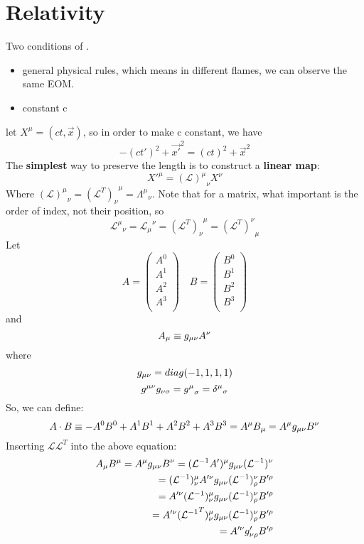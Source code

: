 \section{Relativity}
Two conditions of \SR{}. 
\begin{itemize}
    \item general physical rules, which means in different flames, we can 
	observe the same EOM.
    \item constant c
\end{itemize}
let $X^\mu=(ct, \vec{x})$, so in order to make c constant, we have
\[
    -(ct')^2+\vec{x'}^2 = (ct)^2 +\vec{x}^2
\]
The \textbf{simplest} way to preserve the length is to construct a \textbf{linear map}:
\[
    X'^\mu = {(\mathcal{L})^\mu}_{\nu}X^\nu
\]
Where ${(\mathcal{L})^\mu}_{\nu} = {(\mathcal{L}^T)_\nu}^{\mu} = {\Lambda^\mu}_\nu$.
Note that for a matrix, what important is the order of index, not their position, so
\[
    {\mathcal{L}^{\mu}}_{\nu}={\mathcal{L}_{\mu}}^{\nu}={(\mathcal{L}^T)_{\nu}}^{\mu}={(\mathcal{L}^T)^{\nu}}_{\mu}
\]
Let 
\[
    A = \begin{pmatrix}
	A^0 \\
	A^1 \\
	A^2 \\
	A^3 \\
    \end{pmatrix}\quad
    B = \begin{pmatrix}
	B^0 \\
	B^1 \\
	B^2 \\
	B^3 \\
    \end{pmatrix}
\]
and 
\[
    A_\mu  \equiv g_{\mu\nu}A^\nu
\]
where 
\begin{equation}
    g_{\mu\nu} = diag(-1, 1, 1, 1)
\end{equation}
\[
    g^{\mu\nu}g_{\nu\sigma}={g^{\mu}}_\sigma={\delta^{\mu}}_\sigma 
\]
So, we can define:
\[
    A\cdot B \equiv -A^0B^0 + A^1B^1 + A^2B^2 + A^3B^3 = A^\mu B_\mu = A^\mu g_{\mu\nu}B^\nu
\]
Inserting $\mathcal{L}\mathcal{L}^T$ into the above equation:
\[
    \begin{aligned}
	A_\mu B^\mu= A^\mu g_{\mu\nu}B^\nu = (\mathcal{L}^{-1}A')^{\mu}g_{\mu\nu}(\mathcal{L}^{-1})^\nu \\
	= (\mathcal{L}^{-1})^\mu_{\nu}A'^{\nu}g_{\mu\nu}(\mathcal{L}^{-1})^\nu_{\rho}B'^\rho    \\
	= A'^{\nu}(\mathcal{L}^{-1})^\mu_{\nu}g_{\mu\nu}(\mathcal{L}^{-1})^\nu_{\rho}B'^\rho    \\
	= A'^{\nu}({\mathcal{L}^{-1}}^T)_\nu^{\mu}g_{\mu\nu}(\mathcal{L}^{-1})^\nu_{\rho}B'^\rho    \\
	= A'^{\nu}g'_{\nu\rho}B'^\rho
    \end{aligned}
\]
